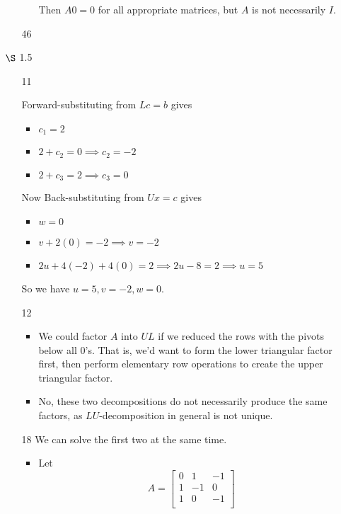 \documentclass[12pt,letterpaper]{article}
\begin{document}
\begin{enumerate}
\begin{enumerate}
\begin{enumerate}[label=(\alph*)]
              Then $A0 = 0$ for all appropriate matrices, but $A$ is not necessarily $I$.
          \end{enumerate}
        \item [46]
      \end{enumerate}
    \item [$\S$ 1.5]
      \begin{enumerate}
        \item [11]

          Forward-substituting from $Lc = b$ gives

          \begin{itemize}
            \item $c_1 = 2$
            \item $2 + c_2 = 0 \implies c_2 = -2$
            \item $2 + c_3 = 2 \implies c_3 = 0$
          \end{itemize}

          Now Back-substituting from $Ux = c$ gives

          \begin{itemize}
            \item $w = 0$
            \item $v + 2(0) = -2 \implies v = -2$
            \item $2u + 4(-2) + 4(0) = 2 \implies 2u - 8 = 2 \implies u = 5$
          \end{itemize}

          So we have $u = 5, v = -2, w = 0$.
        \item [12]
          \begin{itemize}
            \item

              We could factor $A$ into $UL$ if we reduced the rows with the pivots below all 0's.
              That is, we'd want to form the lower triangular factor first,
              then perform elementary row operations to create the upper triangular factor.

            \item
              No, these two decompositions do not necessarily produce the same factors,
              as $LU$-decomposition in general is not unique.
          \end{itemize}
        \item [18]
          We can solve the first two at the same time.
          \begin{itemize}
            \item
              Let
              \[
                A
                =
                \begin{bmatrix}
                  0  &  1 & -1 \\
                  1  & -1 &  0 \\
                  1  &  0 & -1 \\
                \end{bmatrix}
              \]


\end{itemize}
\end{enumerate}
\end{enumerate}
\end{document}
